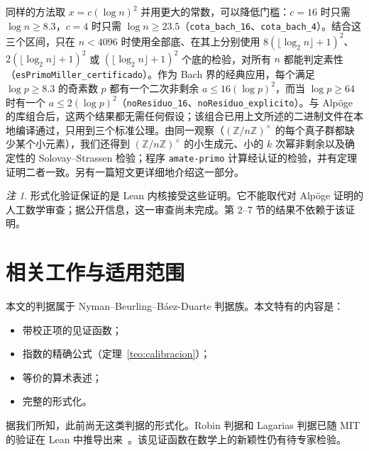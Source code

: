 \documentclass[11pt,a4paper]{amsart}
\theoremstyle{definition}
\theoremstyle{remark}
\newtheorem{observacion}[teorema]{注}
\begin{document}
同样的方法取 $x=c(\log n)^2$ 并用更大的常数，可以降低门槛：$c=16$ 时只需 $\log n\ge 8.3$，$c=4$ 时只需 $\log n\ge 23.5$（\texttt{cota\_bach\_16}、\texttt{cota\_bach\_4}）。结合这三个区间，只在 $n<4096$ 时使用全部底、在其上分别使用 $8(\lfloor\log_2 n\rfloor+1)^2$、$2(\lfloor\log_2 n\rfloor+1)^2$ 或 $(\lfloor\log_2 n\rfloor+1)^2$ 个底的检验，对所有 $n$ 都能判定素性（\texttt{esPrimoMiller\_certificado}）。作为 Bach 界的经典应用，每个满足 $\log p\ge 8.3$ 的奇素数 $p$ 都有一个二次非剩余 $a\le 16(\log p)^2$，而当 $\log p\ge 64$ 时有一个 $a\le 2(\log p)^2$（\texttt{noResiduo\_16}、\texttt{noResiduo\_explicito}）。与 Alp\"oge 的库组合后，这两个结果都无需任何假设；该组合已用上文所述的二进制文件在本地编译通过，只用到三个标准公理。由同一观察（$(\mathbb Z/n\mathbb Z)^\times$ 的每个真子群都缺少某个小元素），我们还得到 $(\mathbb Z/n\mathbb Z)^\times$ 的小生成元、小的 $k$ 次幂非剩余以及确定性的 Solovay--Strassen 检验；程序 \texttt{amate-primo} 计算经认证的检验，并有定理证明二者一致。另有一篇短文更详细地介绍这一部分。

\begin{observacion}
形式化验证保证的是 Lean 内核接受这些证明。它不能取代对 Alp\"oge 证明的人工数学审查；据公开信息，这一审查尚未完成。第 2--7 节的结果不依赖于该证明。
\end{observacion}

\section{相关工作与适用范围}

本文的判据属于 Nyman--Beurling--B\'aez-Duarte 判据族。本文特有的内容是：
\begin{itemize}
\item 带校正项的见证函数；
\item 指数的精确公式（定理~\ref{teo:calibracion}）；
\item 等价的算术表述；
\item 完整的形式化。
\end{itemize}
据我们所知，此前尚无这类判据的形式化。Robin 判据和 Lagarias 判据已随 MIT 的验证在 Lean 中推导出来~\cite{MIT}。该见证函数在数学上的新颖性仍有待专家检验。
\end{document}
